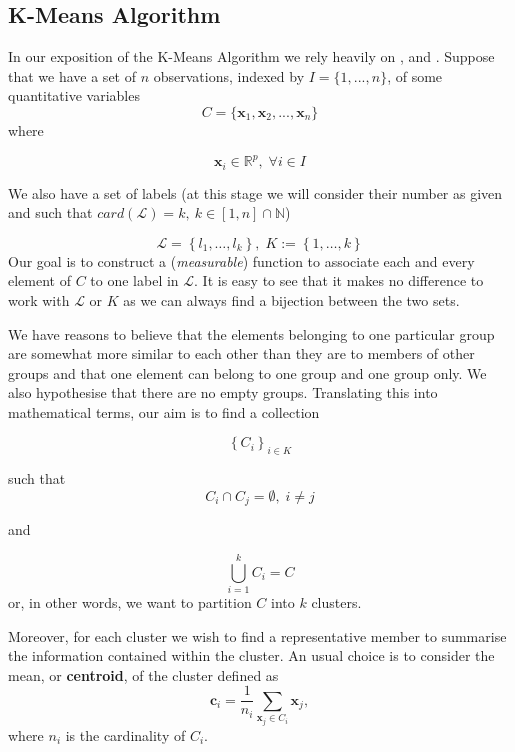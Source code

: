 \documentclass[a4paper]{article}
\begin{document}
	\subsection{K-Means Algorithm}
	In our exposition of the K-Means Algorithm we rely heavily on \cite{hastie01statisticallearning}, \cite{MR2372475} and \cite{zaki2014dataminingbook}.
	Suppose that we have a set of $n$ observations, indexed by $I = \{1, ..., n\}$, of some quantitative
	variables
	$$ C = \{ \boldsymbol{x}_{1}, \boldsymbol{x}_{2}, ..., \boldsymbol{x}_{n} \} $$
	where

	$$ \boldsymbol{x}_{i} \in \mathbb{R}^{p},\;\forall i\in I$$


	We also have a set of labels (at this stage we will consider their
	number as given and such that $card(\mathcal{L})=k,\:k\in\left[1,n\right]\cap\mathbb{N}$)

	$$
	\mathcal{L}=\left\{ l_{1},\ldots,l_{k}\right\} ,\;K:=\left\{ 1,\ldots,k\right\}
	$$
	Our goal is to construct a (\textit{measurable}) function to associate each
	and every element of $C$ to one label in $\mathcal{L}$. It is easy
	to see that it makes no difference to work with $\mathcal{L}$ or
	$K$ as we can always find a bijection between the two sets.

	We have reasons to believe that the elements belonging to one particular
	group are somewhat more similar to each other than they are to members
	of other groups and that one element can belong to one group and one
	group only. We also hypothesise that there are no empty groups. Translating
	this into mathematical terms, our aim is to find a collection

	$$ 	\left\{ C_{i}\right\} _{i\in K}	$$

	such that
	$$ C_{i}\cap C_{j}=\emptyset,\;i\neq j $$

	and

	$$
	\bigcup_{i=1}^{k} C_{i} = C
	$$
	or, in other words, we want to partition $C$ into $k$ clusters.

	Moreover, for each cluster we wish to find a representative member to summarise the information contained within the cluster. An usual choice is to consider the mean, or \textbf{centroid}, of the cluster defined as
	\begin{equation*}
	\boldsymbol{c}_{i} = \frac{1}{n_{i}} \sum_{\boldsymbol{x}_{j} \in C_{i}} \boldsymbol{x}_{j},
	\end{equation*}
	where $n_{i}$ is the cardinality of $C_{i}$.\\
\end{document}
